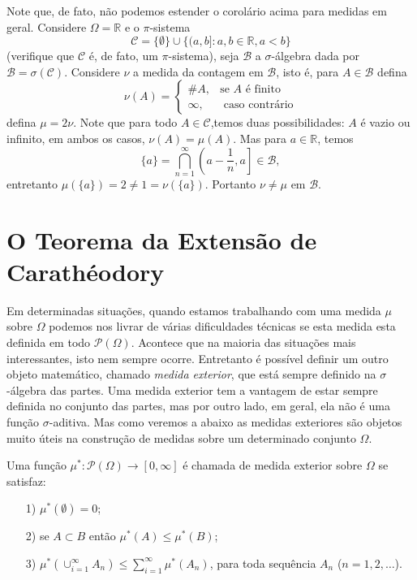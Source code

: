 \begin{exemplo} \label{exemplo-extensão=nao-unica}
	Note que, de fato, não podemos estender o corolário acima para medidas em geral.
	Considere $\Omega = \mathbb{R}$ e o  $\pi$-sistema 
	\[
	    \mathcal{C} = \{\emptyset\}\cup\{(a,b] : a,b \in \mathbb{R}, a<b\}
	\]
	(verifique que $\mathcal{C}$ é, de fato, um $\pi$-sistema), seja $\mathcal{B}$
	a $\sigma$-álgebra dada por $\mathcal{B}=\sigma(\mathcal{C})$. Considere 
	$\nu$ a medida da contagem em $\mathcal{B}$, isto é, para $A \in \mathcal{B}$ 
	defina
	\[
	    \nu(A) = 
	    \begin{cases}
	        \#A, & \text{se $A$ é finito} \\
	        \infty, & \text{ caso contrário}
        \end{cases}
	\]	
	defina $\mu = 2 \nu$. Note que para todo $A \in \mathcal{C}$,temos duas 
	possibilidades: $A$ é vazio ou infinito, em ambos os casos, $\nu(A) = \mu(A)$.
	Mas para $a \in \mathbb{R}$, temos 
	\[
	    \{a\} = \bigcap_{n=1}^\infty \left(a-\frac{1}{n},a\right]\in \mathcal{B},
	\]
	entretanto $\mu(\{a\}) = 2 \neq 1 = \nu(\{a\})$. Portanto $\nu \neq \mu$ em
	$\mathcal{B}$.
\end{exemplo}

\section{O Teorema da Extensão de Carathéodory}


Em determinadas situações, quando estamos trabalhando 
com uma medida $\mu$ sobre $\Omega$ podemos nos livrar de várias 
dificuldades técnicas se esta medida esta definida
em todo $\mathcal{P}(\Omega)$. Acontece que na maioria das situações mais 
interessantes, isto nem sempre ocorre. Entretanto é possível definir um outro objeto 
matemático, chamado {\it medida exterior}, que está sempre definido na 
$\sigma$-álgebra das partes.
Uma medida exterior tem a vantagem de estar sempre 
definida no conjunto das partes, mas por outro lado, em geral, 
ela não é uma função $\sigma$-aditiva. 
Mas como veremos a abaixo as medidas exteriores são objetos muito 
úteis na construção de medidas sobre um determinado conjunto $\Omega$.



\begin{definicao}
\label{definicao-medida-exterior}
	Uma função $\mu^*:\mathcal{P}(\Omega)\to [0,\infty]$ é chamada de medida exterior 
	sobre $\Omega$ se satisfaz:
	\begin{itemize}
		\item[1)] $\mu^*(\emptyset)=0$;
		\item[2)] se $A\subset B$ então $\mu^*(A)\leq \mu^*(B)$;
		\item[3)] $\mu^{*}(\cup_{i=1}^{\infty} A_n) \leq \sum_{i=1}^{\infty} \mu^{*}(A_n)$, para toda
					sequência $A_n$ ($n=1,2,\ldots$).
	\end{itemize}
\end{definicao}






